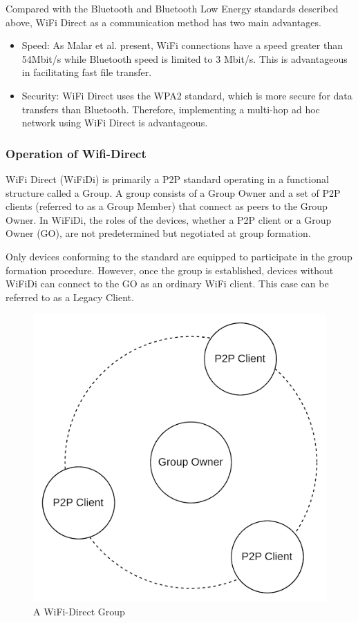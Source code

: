 \documentclass[12pt, conference, onecolumn, a4paper]{IEEEtran}
\begin{document}
Compared with the Bluetooth and Bluetooth Low Energy standards described above,
WiFi Direct as a communication method has two main advantages.

\begin{itemize}
    \item Speed: As Malar et al. present, WiFi connections have a speed greater
          than 54Mbit/s while Bluetooth speed is limited to 3 Mbit/s. This is
          advantageous in facilitating fast file transfer.

    \item Security: WiFi Direct uses the WPA2 standard, which is more secure
          for data transfers than Bluetooth.
          Therefore, implementing a multi-hop ad hoc network using WiFi Direct
          is
          advantageous.

\end{itemize}

\vspace{0.3cm}

\subsubsection{Operation of Wifi-Direct}
WiFi Direct (WiFiDi) is primarily a P2P standard operating in a functional
structure called a Group. A group consists of a Group Owner and a set of P2P
clients (referred to as a Group Member) that connect as peers to the Group
Owner. In WiFiDi, the roles of the devices, whether a P2P client or a Group
Owner (GO), are not predetermined but negotiated at group formation.

Only devices conforming to the standard are equipped to participate in the
group formation procedure. However, once the group is established, devices
without WiFiDi can connect to the GO as an ordinary WiFi
client\cite{funai2015}\cite{wifidispec}. This case can be referred to as a
Legacy Client.

\begin{figure}[htbp]
    \centerline{\includegraphics[height=0.45\textwidth]{imgs/group.png}}
    \caption{A WiFi-Direct Group}
    \label{digroup}
\end{figure}
\end{document}

